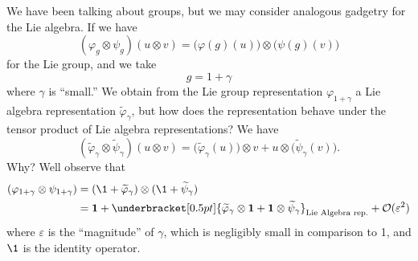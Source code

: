 We have been talking about groups, but we may consider analogous
gadgetry for the Lie algebra. If we have
\begin{equation}
(\varphi_{g}\otimes\psi_{g})(u\otimes v)=\big(\varphi(g)(u)\big)\otimes\big(\psi(g)(v)\big)
\end{equation}
for the Lie group, and we take 
\begin{equation}
g=1+\gamma
\end{equation}
where $\gamma$ is ``small.'' We obtain from the Lie group
representation $\varphi_{1+\gamma}$ a Lie algebra representation
$\widetilde{\varphi}_{\gamma}$, but how does the representation
behave under the tensor product of Lie algebra representations?
We have
\begin{equation}
(\widetilde\varphi_{\gamma}\otimes\widetilde\psi_{\gamma})(u\otimes v)=
\big(\widetilde\varphi_{\gamma}(u)\big)\otimes v + u\otimes\big(\widetilde\psi_{\gamma}(v)\big).
\end{equation}
Why? Well observe that
\begin{subequations}
\begin{align}
(\varphi_{1+\gamma}\otimes\psi_{1+\gamma}) 
&= (\1+\widetilde\varphi_{\gamma})\otimes(\1+\widetilde\psi_{\gamma})\\
&= {\bf 1} +
  \underbracket[0.5pt]{\widetilde{\varphi}_{\gamma}\otimes{\bf 1}
+{\bf 1}\otimes\widetilde{\psi}_{\gamma}}_{\text{Lie Algebra rep.}} + \mathcal{O}(\varepsilon^{2})
\end{align}
\end{subequations}
where $\varepsilon$ is the ``magnitude'' of $\gamma$, which is
negligibly small in comparison to 1, and $\1$ is the
identity operator.

